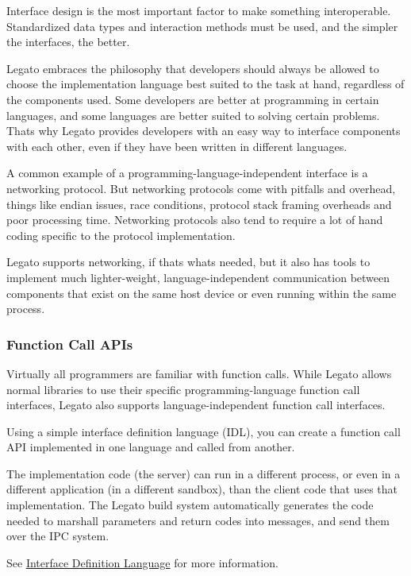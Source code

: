 Interface design is the most important factor to make something interoperable. Standardized data types and interaction methods must be used, and the simpler the interfaces, the better.

Legato embraces the philosophy that developers should always be allowed to choose the implementation language best suited to the task at hand, regardless of the components used. Some developers are better at programming in certain languages, and some languages are better suited to solving certain problems. That\textquotesingle{}s why Legato provides developers with an easy way to interface components with each other, even if they have been written in different languages.

A common example of a programming-\/language-\/independent interface is a networking protocol. But networking protocols come with pitfalls and overhead, things like endian issues, race conditions, protocol stack framing overheads and poor processing time. Networking protocols also tend to require a lot of hand coding specific to the protocol implementation.

Legato supports networking, if that\textquotesingle{}s what\textquotesingle{}s needed, but it also has tools to implement much lighter-\/weight, language-\/independent communication between components that exist on the same host device or even running within the same process.\hypertarget{basic_interfaces_functionCallAPIs}{}\subsubsection{Function Call A\+P\+Is}\label{basic_interfaces_functionCallAPIs}
Virtually all programmers are familiar with function calls. While Legato allows normal libraries to use their specific programming-\/language function call interfaces, Legato also supports language-\/independent function call interfaces.

Using a simple interface definition language (I\+D\+L), you can create a function call A\+P\+I implemented in one language and called from another.

The implementation code (the server) can run in a different process, or even in a different application (in a different sandbox), than the client code that uses that implementation. The Legato build system automatically generates the code needed to marshall parameters and return codes into messages, and send them over the I\+P\+C system.

See \hyperlink{interfaceDefLang}{Interface Definition Language} for more information.





